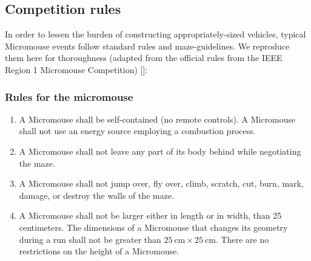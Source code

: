 \documentclass[10pt,twocolumn,letterpaper]{article}
\begin{document}
\subsection{Competition rules}
\label{subsec:rules}
In order to lessen the burden of constructing appropriately-sized vehicles, typical Micromouse events follow standard
rules and maze-guidelines.  We reproduce them here for thoroughness (adapted from the official rules from the IEEE
Region 1 Micromouse
Competition) []:

\subsubsection{Rules for the micromouse}
\label{subsubsec:mouserules}
\begin{enumerate}
	\item A Micromouse shall be self-contained (no remote controls). A Micromouse shall not use an energy source
	employing a combustion process.
	\item A Micromouse shall not leave any part of its body behind while negotiating the maze.
	\item A Micromouse shall not jump over, fly over, climb, scratch, cut, burn, mark, damage, or destroy
	the walls of the maze.
	\item A Micromouse shall not be larger either in length or in width, than 25 centimeters. The dimensions of a
	Micromouse that changes its geometry during a run shall not be greater than $25\ \textrm{cm} \times 25\
	\textrm{cm}$. There are no restrictions on the height of a Micromouse.
\end{enumerate}
\end{document}

